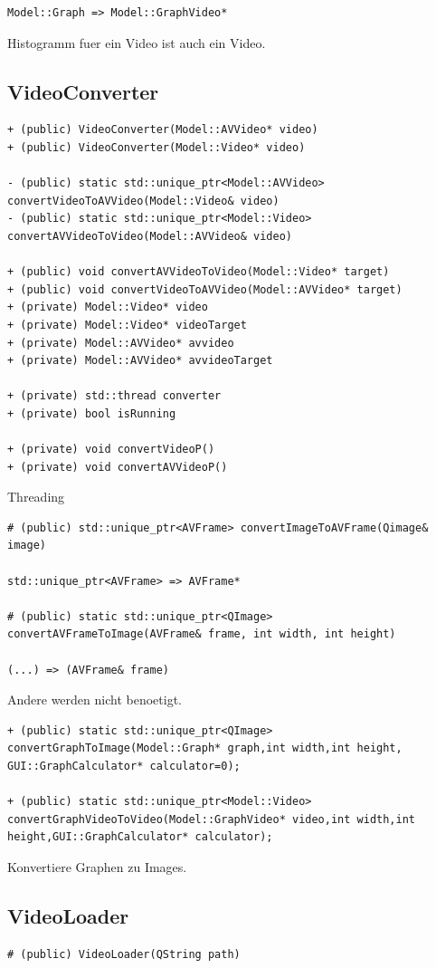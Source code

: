 \documentclass{scrartcl}
\begin{document}
{\begin{verbatim}
Model::Graph => Model::GraphVideo*
\end{verbatim}
Histogramm fuer ein Video ist auch ein Video.
\subsection{VideoConverter}
\begin{verbatim}
+ (public) VideoConverter(Model::AVVideo* video)
+ (public) VideoConverter(Model::Video* video)

- (public) static std::unique_ptr<Model::AVVideo> convertVideoToAVVideo(Model::Video& video)
- (public) static std::unique_ptr<Model::Video> convertAVVideoToVideo(Model::AVVideo& video)

+ (public) void convertAVVideoToVideo(Model::Video* target)
+ (public) void convertVideoToAVVideo(Model::AVVideo* target)
+ (private) Model::Video* video
+ (private) Model::Video* videoTarget
+ (private) Model::AVVideo* avvideo
+ (private) Model::AVVideo* avvideoTarget

+ (private) std::thread converter
+ (private) bool isRunning

+ (private) void convertVideoP()
+ (private) void convertAVVideoP()
\end{verbatim}
Threading
\begin{verbatim}
# (public) std::unique_ptr<AVFrame> convertImageToAVFrame(Qimage& image)

std::unique_ptr<AVFrame> => AVFrame*

# (public) static std::unique_ptr<QImage> convertAVFrameToImage(AVFrame& frame, int width, int height)

(...) => (AVFrame& frame)
\end{verbatim}
Andere werden nicht benoetigt.
\begin{verbatim}
+ (public) static std::unique_ptr<QImage> convertGraphToImage(Model::Graph* graph,int width,int height, GUI::GraphCalculator* calculator=0);

+ (public) static std::unique_ptr<Model::Video> convertGraphVideoToVideo(Model::GraphVideo* video,int width,int height,GUI::GraphCalculator* calculator);

\end{verbatim}
Konvertiere Graphen zu Images.
\subsection{VideoLoader}
\begin{verbatim}
# (public) VideoLoader(QString path)


\end{verbatim}}
\end{document}
